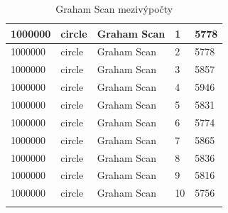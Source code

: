 \documentclass[12pt]{article}
\begin{document}
\begin{longtable}{|l|l|l|l|l|}
1000000      & circle            & Graham Scan & 1          & 5778                          \\ \hline
1000000      & circle            & Graham Scan & 2          & 5778                          \\ \hline
1000000      & circle            & Graham Scan & 3          & 5857                          \\ \hline
1000000      & circle            & Graham Scan & 4          & 5946                          \\ \hline
1000000      & circle            & Graham Scan & 5          & 5831                          \\ \hline
1000000      & circle            & Graham Scan & 6          & 5774                          \\ \hline
1000000      & circle            & Graham Scan & 7          & 5865                          \\ \hline
1000000      & circle            & Graham Scan & 8          & 5836                          \\ \hline
1000000      & circle            & Graham Scan & 9          & 5816                          \\ \hline
1000000      & circle            & Graham Scan & 10         & 5756                          \\ \hline
\caption{Graham Scan mezivýpočty}
\end{longtable}

    
\end{document}
